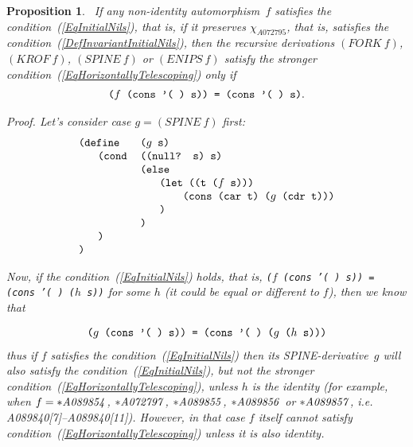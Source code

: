 \documentclass[11pt]{article} %
\newtheorem{propo}{Proposition}
\newcommand{\eqn}[1]{(\ref{#1})}
\newcommand{\eeq}{\end{equation}}
\newcommand{\beql}[1]{\begin{equation}\label{#1}}
\newcommand{\autname}[1]{{\it *#1}}
\newcommand{\autletter}[1]{$#1$}
\newcommand{\automorphismlet}[1]{automorphism~\autletter{#1}}
\newcommand{\EISseq}[1]{{\tt #1}}
\newcommand{\charfun}[1]{\ensuremath{\chi_{{#1}}}}
\newcommand{\charfunforcarnil}{\charfun{A072795}}
\newcommand{\scmcode}[1]{{\tt{#1}}}
\newcommand{\scmcodeintext}[1]{{\tt{#1}}}
\newenvironment{scmdefinefun}{\begin{tabular}{l l l p{5cm}}}{\end{tabular}}
\newenvironment{scmdefinefun7}{\begin{tabular}{l l l l l l l}}{\end{tabular}}
\begin{document}
\begin{propo}~\label{recursive_derivations_of_InitialNil_preserving_automorphisms}
\normalfont
If any non-identity \automorphismlet{f} satisfies the
condition~\eqn{EqInitialNils},
that is, if it preserves {\charfunforcarnil}, %
that is, satisfies the condition~\eqn{DefInvariantInitialNils},
then the recursive derivations $(FORK~f)$, $(KROF~f)$, $(SPINE~f)$ or $(ENIPS~f)$
satisfy the stronger condition~\eqn{EqHorizontallyTelescoping} only if
\beql{Condition_QQQ}
\begin{scmdefinefun}
\scmcode{($f$ (cons '( ) s)) = (cons '( ) s)}.
\end{scmdefinefun}
\eeq

\textit{Proof.} Let's consider case $g = (SPINE~f)$ first:
\beql{SchemeCodeFor_g_SPINE_f}
\begin{scmdefinefun7}

\multicolumn{2}{l}{\scmcode{(define}} & \multicolumn{2}{l}{\scmcode{($g$ s)}}\\
 & \scmcode{(cond} & \multicolumn{3}{l}{\scmcode{((null? s) s)}}\\
 &                 & \multicolumn{2}{l}{\scmcode{(else}}\\
 &                 & & \multicolumn{2}{l}{\scmcode{(let ((t ($f$ s)))}}\\
 &                 & & & \scmcode{(cons (car t) ($g$ (cdr t)))}\\
 &                 & & \scmcode{)}\\
& & \scmcode{)}\\
& \scmcode{)}\\
\scmcode{)}\\

\end{scmdefinefun7}
\eeq

Now, if  the condition~\eqn{EqInitialNils} holds, that is,
\scmcodeintext{($f$ (cons '( ) s)) = (cons '( ) ($h$ s))} for some $h$
(it could be equal or different to $f$),
then we know that

\beql{Proof_QQQ}
\begin{scmdefinefun}
\scmcode{($g$ (cons '( ) s)) = (cons '( ) ($g$ ($h$ s)))}
\end{scmdefinefun}
\eeq
thus if $f$ satisfies the condition~\eqn{EqInitialNils}
then its SPINE-derivative~$g$ will also satisfy the
condition~\eqn{EqInitialNils},
but not the stronger condition~\eqn{EqHorizontallyTelescoping},
unless $h$ is the identity (for example, when
$f = \autname{A089854}$, $\autname{A072797}$, $\autname{A089855}$,
$\autname{A089856}$ or $\autname{A089857}$, i.e. A089840[7]--A089840[11]).
However, in that case $f$ itself cannot satisfy
condition~\eqn{EqHorizontallyTelescoping} unless it is also
identity.


\end{propo}
\end{document}
